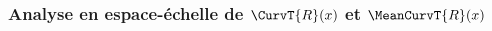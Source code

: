 




\subsubsection{Analyse en espace-échelle de $\CurvT{R}(x)$ et $\MeanCurvT{R}(x)$}
\label{sec:applications:feature:II:analyse}

